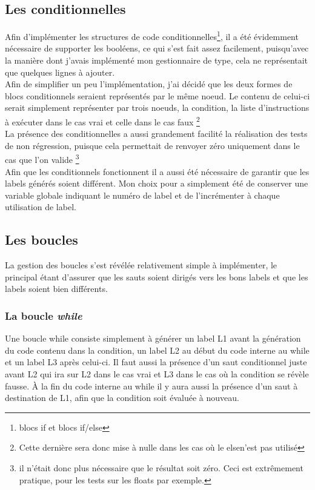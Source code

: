 \documentclass[12pt]{article}
\begin{document}
\subsection{Les conditionnelles}
Afin d'implémenter les structures de code conditionnelles\footnote{blocs if
et blocs if/else}, il a été évidemment nécessaire de supporter les booléens,
ce qui s'est fait assez facilement, puisqu'avec la manière dont j'avais
implémenté mon gestionnaire de type, cela ne représentait que quelques lignes
à ajouter.\\

Afin de simplifier un peu l'implémentation, j'ai décidé que les deux formes
de blocs conditionnels seraient représentés par le même noeud. Le contenu de
celui-ci serait simplement représenter par trois noeuds, la condition, la
liste d'instructions à exécuter dans le cas vrai et celle dans le cas faux
\footnote{Cette dernière sera donc mise à nulle dans les cas où le elsen'est
pas utilisé}\\

La présence des conditionnelles a aussi grandement facilité la réalisation
des tests de non régression, puisque cela permettait de renvoyer zéro
uniquement dans le cas que l'on valide \footnote{il n'était donc plus
nécessaire que le résultat soit zéro. Ceci est extrêmement pratique, pour les
tests sur les floats par exemple.}\\

Afin que les conditionnels fonctionnent il a aussi été nécessaire de garantir
que les labels générés soient différent. Mon choix pour a simplement été
de conserver une variable globale indiquant le numéro de label et de
l'incrémenter à chaque utilisation de label.

\subsection{Les boucles}
La gestion des boucles s'est révélée relativement simple à implémenter,
le principal étant d'assurer que les sauts soient dirigés vers les bons
labels et que les labels soient bien différents.

\subsubsection{La boucle \em{while}}
Une boucle while consiste simplement à générer un label L1 avant la
génération du code contenu dans la condition, un label L2 au début du code
interne au while et un label L3 après celui-ci. Il faut aussi la présence
d'un saut conditionnel juste avant L2 qui ira sur L2 dans le cas vrai et L3
dans le cas où la condition se révèle fausse. À la fin du code interne au
while il y aura aussi la présence d'un saut à destination de L1, afin que la
condition soit évaluée à nouveau.
\end{document}
